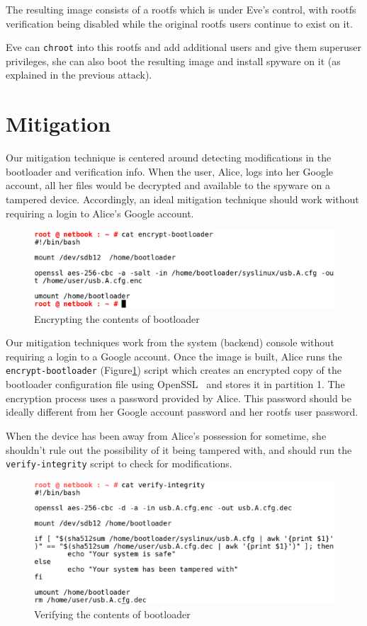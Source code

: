 \documentclass[11pt]{article}
\begin{document}
\begin{enumerate}
The resulting image consists of a rootfs which is under Eve's
control, with rootfs verification being disabled while the original
rootfs users continue to exist on it.

Eve can \texttt{chroot} into this rootfs and add additional users and give them
superuser privileges, she can also boot the resulting image and install
spyware on it (as explained in the previous attack).

\end{enumerate}
\section{Mitigation}

Our mitigation technique is centered around detecting modifications
in the bootloader and verification info. When the user, Alice, logs into her Google account, all her files would be decrypted and available
to the spyware on a tampered device. Accordingly, an ideal mitigation technique should work without requiring a login to Alice's Google account. 
\begin{figure}[htbp]
  \centering
   \includegraphics[scale=0.3]{Figure/encrypt-bl.eps}
\caption{\small{Encrypting the contents of bootloader}}
\label{fig:encrypt-bl}
\end{figure}


Our mitigation techniques work from the system (backend) console without requiring a login to a Google account. Once the image is built, Alice runs the \texttt{encrypt-bootloader} (Figure{\ref{fig:encrypt-bl}}) script which 
creates an encrypted copy of the bootloader configuration file using OpenSSL~\cite{openssl} and stores it in partition 1.
The encryption process uses a password provided by Alice. This password should be ideally different from her Google account password and her rootfs user password.

When the device has been away from Alice's possession for sometime, she shouldn't rule out the possibility of
it being tampered with, and should run the \texttt{verify-integrity} script to check for modifications.
\begin{figure}[htbp]
  \centering
   \includegraphics[scale=0.3]{Figure/verify-bl.eps}
\caption{\small{Verifying the contents of bootloader}}
\label{fig:verify-bl}
\end{figure}
\end{document}
